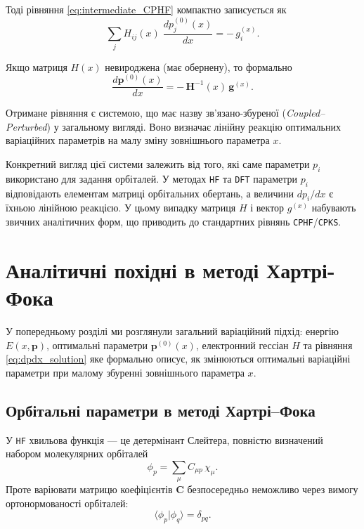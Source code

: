 Тоді рівняння \eqref{eq:intermediate_CPHF} компактно записується як
\begin{equation}
	\sum_j H_{ij}(x)\;\frac{d p_j^{(0)}(x)}{dx} = -\,g_i^{(x)}.
	\label{eq:CPHF_derived_compact}
\end{equation}

Якщо матриця \(H(x)\) невироджена (має обернену), то формально
\begin{equation}
	\frac{d\mathbf p^{(0)}(x)}{dx} = -\,\mathbf{H}^{-1}(x)\,\mathbf g^{(x)}.
	\label{eq:dpdx_solution}
\end{equation}

Отримане рівняння є системою, що має назву
зв'язано-збуреної (\emph{Coupled--Perturbed}) у загальному вигляді.
Воно визначає лінійну реакцію оптимальних варіаційних параметрів
на малу зміну зовнішнього параметра \(x\).

Конкретний вигляд цієї системи залежить від того, які саме параметри \(p_i\)
використано для задання орбіталей.
У методах \texttt{HF} та \texttt{DFT} параметри \(p_i\) відповідають
елементам матриці орбітальних обертань, а величини \(dp_i/dx\)
є їхньою лінійною реакцією.
У цьому випадку матриця \(H\) і вектор \(g^{(x)}\) набувають
звичних аналітичних форм, що приводить до стандартних рівнянь
\texttt{CPHF}/\texttt{CPKS}.


\section{Аналітичні похідні в методі Хартрі-Фока}

У попередньому розділі ми розглянули загальний варіаційний підхід:
енергію $E(x,\mathbf p)$, оптимальні параметри $\mathbf p^{(0)}(x)$,
електронний гессіан $H$ та рівняння \eqref{eq:dpdx_solution}
яке формально описує, як змінюються оптимальні варіаційні параметри
при малому збуренні зовнішнього параметра $x$.

\subsection{Орбітальні параметри в методі Хартрі--Фока}

У \texttt{HF} хвильова функція --- це детермінант Слейтера, повністю
визначений набором молекулярних орбіталей
\[
	\phi_p = \sum_\mu C_{\mu p}\,\chi_\mu .
\]
Проте варіювати матрицю коефіцієнтів $\mathbf C$ безпосередньо неможливо через
вимогу ортонормованості орбіталей:
\[
	\langle\phi_p|\phi_q\rangle=\delta_{pq}.
\]

